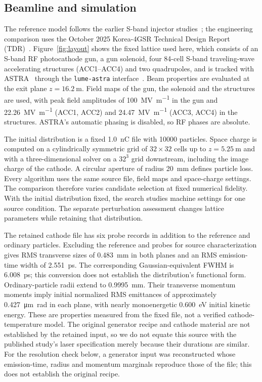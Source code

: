 \documentclass[aps,prab,reprint,superscriptaddress,amsmath,amssymb,floatfix]{revtex4-2}
\begin{document}
\subsection{Beamline and simulation}
The reference model follows the earlier S-band injector studies~\cite{Kim2024KLSMOGA,Kim2025KLSError};
the engineering comparison uses the October 2025 Korea-4GSR Technical Design Report
(TDR)~\cite{KLSTDR2025}.
Figure~\ref{fig:layout} shows the fixed lattice used here, which consists of an S-band RF
photocathode gun, a gun solenoid, four 84-cell S-band
traveling-wave accelerating structures (ACC1--ACC4) and two quadrupoles, and is tracked with
ASTRA~\cite{Floettmann2017Astra} through the \texttt{lume-astra} interface~\cite{LumeAstra}.
Beam properties are evaluated at the exit plane $z = \SI{16.2}{\metre}$. Field maps of the gun, the
solenoid and the structures are used, with
peak field amplitudes of \SI{100}{\mega\volt\per\metre} in the gun and
\SI{22.26}{\mega\volt\per\metre} (ACC1, ACC2) and
\SI{24.47}{\mega\volt\per\metre} (ACC3, ACC4) in the structures. ASTRA's automatic phasing is
disabled, so RF phases
are absolute.

The initial distribution is a fixed \SI{1.0}{\nano\coulomb} file with \num{10000} particles.
Space charge is computed on a cylindrically symmetric grid of $32\times32$ cells
up to $z = \SI{5.25}{\metre}$ and with a three-dimensional solver on a $32^3$ grid downstream,
including the image charge of the cathode. A circular aperture of radius \SI{20}{\milli\metre}
defines particle loss. Every algorithm uses the same source file, field maps and space-charge
settings. The comparison therefore varies candidate selection at fixed numerical fidelity. With
the initial distribution fixed, the search studies machine settings for one source condition.
The separate perturbation assessment changes lattice parameters while retaining that
distribution.

The retained cathode file has six probe records in addition to the reference and ordinary
particles. Excluding the reference and probes for source characterization gives RMS transverse
sizes of \SI{0.483}{\milli\metre} in both planes and an RMS emission-time width of
\SI{2.551}{\pico\second}. The corresponding Gaussian-equivalent FWHM is
\SI{6.008}{\pico\second}; this conversion does not establish the distribution's functional
form. Ordinary-particle radii extend to \SI{0.9995}{\milli\metre}. Their transverse
momentum moments imply initial normalized RMS emittances of approximately
\SI{0.427}{\micro\metre\radian} in each plane, with nearly monoenergetic
\SI{0.600}{\electronvolt} initial kinetic energy. These are properties measured from the
fixed file, not a verified cathode-temperature model. The original generator recipe and
cathode material are not established by the retained input, so we do not equate this source
with the published study's laser specification merely because their durations are similar.
For the resolution check below, a generator input was reconstructed whose emission-time,
radius and momentum marginals reproduce those of the file; this does not establish the
original recipe.
\end{document}
